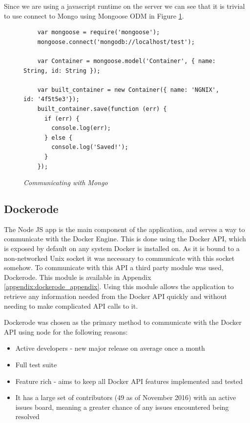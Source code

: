 Since we are using a javascript runtime on the server we can see that it is trivial to use connect to Mongo using Mongoose ODM in Figure \ref{fig:mongo}.

\begin{figure}[!ht]
\begin{lstlisting}
	var mongoose = require('mongoose');
	mongoose.connect('mongodb://localhost/test');

	var Container = mongoose.model('Container', { name: String, id: String });

	var built_container = new Container({ name: 'NGNIX', id: '4f5t5e3'});
	built_container.save(function (err) {
	  if (err) {
	    console.log(err);
	  } else {
	    console.log('Saved!');
	  }
	});
\end{lstlisting}
\caption{\em Communicating with Mongo}
\label{fig:mongo}
\end{figure}

\subsection{Dockerode}
\label{sub:dockerode}

The Node JS app is the main component of the application, and serves a way to communicate with the Docker Engine. This is done using the Docker \gls{API}, which is exposed by default on any system Docker is installed on. As it is bound to a non-networked Unix socket it was necessary to communicate with this socket somehow. To communicate with this API a third party module was used, Dockerode. This module is available in Appendix \ref{appendix:dockerode_appendix}. Using this module allows the application to retrieve any information needed from the Docker API quickly and without needing to make complicated \gls{API} calls to it. 

Dockerode was chosen as the primary method to communicate with the Docker API using node for the following reasons:

\begin{itemize}
	\item Active developers - new major release on average once a month
	\item Full test suite
	\item Feature rich - aims to keep all Docker API features implemented and tested
	\item It has a large set of contributors (49 as of November 2016) with an active issues board, meaning a greater chance of any issues encountered being resolved
\end{itemize}

